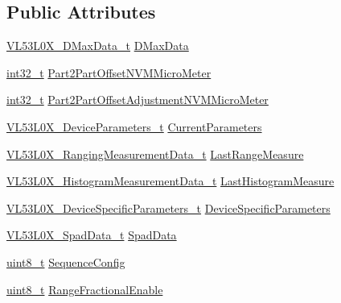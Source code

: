 \subsection*{Public Attributes}
\begin{DoxyCompactItemize}
\item 
\hyperlink{structVL53L0X__DMaxData__t}{V\+L53\+L0\+X\+\_\+\+D\+Max\+Data\+\_\+t} \hyperlink{structVL53L0X__DevData__t_a2acc06ceafef9afc6687aa9216fffb66}{D\+Max\+Data}
\item 
\hyperlink{vl53l0x__types_8h_a32f2e37ee053cf2ce8ca28d1f74630e5}{int32\+\_\+t} \hyperlink{structVL53L0X__DevData__t_aab25fa7eaf3170a3b510cbe4abc63e99}{Part2\+Part\+Offset\+N\+V\+M\+Micro\+Meter}
\item 
\hyperlink{vl53l0x__types_8h_a32f2e37ee053cf2ce8ca28d1f74630e5}{int32\+\_\+t} \hyperlink{structVL53L0X__DevData__t_a0853140c55bf2320db3881a42226bbd7}{Part2\+Part\+Offset\+Adjustment\+N\+V\+M\+Micro\+Meter}
\item 
\hyperlink{structVL53L0X__DeviceParameters__t}{V\+L53\+L0\+X\+\_\+\+Device\+Parameters\+\_\+t} \hyperlink{structVL53L0X__DevData__t_a823d3a952c645f472c3130e7f956f0e1}{Current\+Parameters}
\item 
\hyperlink{structVL53L0X__RangingMeasurementData__t}{V\+L53\+L0\+X\+\_\+\+Ranging\+Measurement\+Data\+\_\+t} \hyperlink{structVL53L0X__DevData__t_aab812161cf71d2ad654e4d3491162221}{Last\+Range\+Measure}
\item 
\hyperlink{structVL53L0X__HistogramMeasurementData__t}{V\+L53\+L0\+X\+\_\+\+Histogram\+Measurement\+Data\+\_\+t} \hyperlink{structVL53L0X__DevData__t_a957c038c2009bd4ea69081ea324f9bf4}{Last\+Histogram\+Measure}
\item 
\hyperlink{structVL53L0X__DeviceSpecificParameters__t}{V\+L53\+L0\+X\+\_\+\+Device\+Specific\+Parameters\+\_\+t} \hyperlink{structVL53L0X__DevData__t_a0f50334a87083360b8c97073a4edd364}{Device\+Specific\+Parameters}
\item 
\hyperlink{structVL53L0X__SpadData__t}{V\+L53\+L0\+X\+\_\+\+Spad\+Data\+\_\+t} \hyperlink{structVL53L0X__DevData__t_a5d1c5466b9220e5253d8890a5cb9e0a7}{Spad\+Data}
\item 
\hyperlink{vl53l0x__types_8h_aba7bc1797add20fe3efdf37ced1182c5}{uint8\+\_\+t} \hyperlink{structVL53L0X__DevData__t_abe609c057515be9541a1776746364fd3}{Sequence\+Config}
\item 
\hyperlink{vl53l0x__types_8h_aba7bc1797add20fe3efdf37ced1182c5}{uint8\+\_\+t} \hyperlink{structVL53L0X__DevData__t_ad5a07400adf4a6daf9e1278cb2f68de1}{Range\+Fractional\+Enable}

\end{DoxyCompactItemize}
